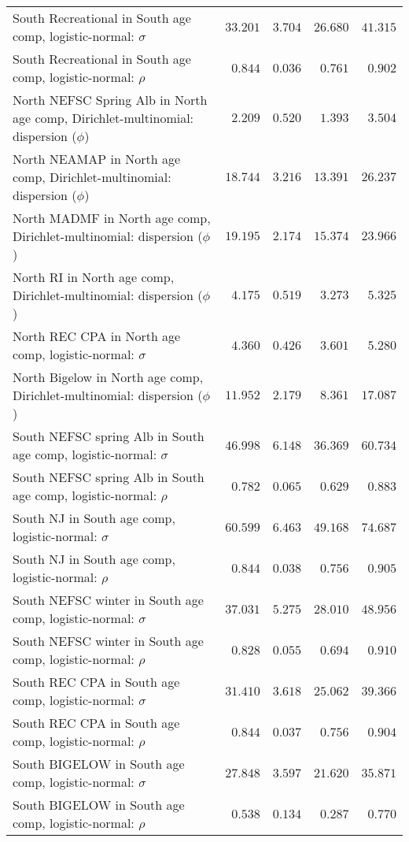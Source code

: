 \documentclass[
]{article}
\begin{document}
\begin{landscape}
\begin{longtable}[t]{lrrrr}
South Recreational in South age comp, logistic-normal: $\sigma$ & $33.201$ & $3.704$ & $26.680$ & $41.315$\\
South Recreational in South age comp, logistic-normal: $\rho$ & $0.844$ & $0.036$ & $0.761$ & $0.902$\\
\addlinespace
North NEFSC Spring Alb in North age comp, Dirichlet-multinomial: dispersion ($\phi$) & $2.209$ & $0.520$ & $1.393$ & $3.504$\\
North NEAMAP in North age comp, Dirichlet-multinomial: dispersion ($\phi$) & $18.744$ & $3.216$ & $13.391$ & $26.237$\\
North MADMF in North age comp, Dirichlet-multinomial: dispersion ($\phi$) & $19.195$ & $2.174$ & $15.374$ & $23.966$\\
North RI in North age comp, Dirichlet-multinomial: dispersion ($\phi$) & $4.175$ & $0.519$ & $3.273$ & $5.325$\\
North REC CPA in North age comp, logistic-normal: $\sigma$ & $4.360$ & $0.426$ & $3.601$ & $5.280$\\
\addlinespace
North Bigelow in North age comp, Dirichlet-multinomial: dispersion ($\phi$) & $11.952$ & $2.179$ & $8.361$ & $17.087$\\
South NEFSC spring Alb in South age comp, logistic-normal: $\sigma$ & $46.998$ & $6.148$ & $36.369$ & $60.734$\\
South NEFSC spring Alb in South age comp, logistic-normal: $\rho$ & $0.782$ & $0.065$ & $0.629$ & $0.883$\\
South NJ in South age comp, logistic-normal: $\sigma$ & $60.599$ & $6.463$ & $49.168$ & $74.687$\\
South NJ in South age comp, logistic-normal: $\rho$ & $0.844$ & $0.038$ & $0.756$ & $0.905$\\
\addlinespace
South NEFSC winter in South age comp, logistic-normal: $\sigma$ & $37.031$ & $5.275$ & $28.010$ & $48.956$\\
South NEFSC winter in South age comp, logistic-normal: $\rho$ & $0.828$ & $0.055$ & $0.694$ & $0.910$\\
South REC CPA in South age comp, logistic-normal: $\sigma$ & $31.410$ & $3.618$ & $25.062$ & $39.366$\\
South REC CPA in South age comp, logistic-normal: $\rho$ & $0.844$ & $0.037$ & $0.756$ & $0.904$\\
South BIGELOW in South age comp, logistic-normal: $\sigma$ & $27.848$ & $3.597$ & $21.620$ & $35.871$\\
\addlinespace
South BIGELOW in South age comp, logistic-normal: $\rho$ & $0.538$ & $0.134$ & $0.287$ & $0.770$\\

\end{longtable}
\end{landscape}
\end{document}

